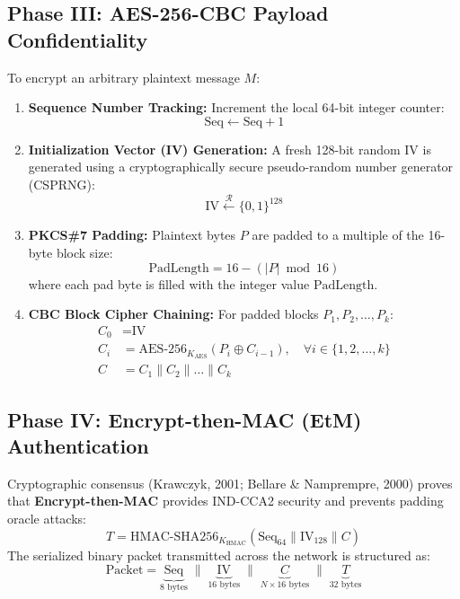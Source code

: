 \documentclass[11pt,a4paper]{article}
\begin{document}
\subsection{Phase III: AES-256-CBC Payload Confidentiality}
To encrypt an arbitrary plaintext message $M$:
\begin{enumerate}[leftmargin=1cm]
    \item \textbf{Sequence Number Tracking:} Increment the local 64-bit integer counter:
    \begin{equation}
        \text{Seq} \leftarrow \text{Seq} + 1
    \end{equation}
    \item \textbf{Initialization Vector (IV) Generation:} A fresh 128-bit random IV is generated using a cryptographically secure pseudo-random number generator (CSPRNG):
    \begin{equation}
        \text{IV} \xleftarrow{\mathcal{R}} \{0, 1\}^{128}
    \end{equation}
    \item \textbf{PKCS\#7 Padding:} Plaintext bytes $P$ are padded to a multiple of the 16-byte block size:
    \begin{equation}
        \text{PadLength} = 16 - (|P| \bmod 16)
    \end{equation}
    where each pad byte is filled with the integer value $\text{PadLength}$.
    \item \textbf{CBC Block Cipher Chaining:} For padded blocks $P_1, P_2, \dots, P_k$:
    \begin{align}
        C_0 &= \text{IV} \\
        C_i &= \text{AES-256}_{K_{\text{AES}}}(P_i \oplus C_{i-1}), \quad \forall i \in \{1, 2, \dots, k\} \\
        C &= C_1 \parallel C_2 \parallel \dots \parallel C_k
    \end{align}
\end{enumerate}

\subsection{Phase IV: Encrypt-then-MAC (EtM) Authentication}
Cryptographic consensus (Krawczyk, 2001; Bellare \& Namprempre, 2000) proves that \textbf{Encrypt-then-MAC} provides IND-CCA2 security and prevents padding oracle attacks:
\begin{equation}
    T = \text{HMAC-SHA256}_{K_{\text{HMAC}}}\left(\text{Seq}_{64} \parallel \text{IV}_{128} \parallel C\right)
\end{equation}
The serialized binary packet transmitted across the network is structured as:
\begin{equation}
    \text{Packet} = \underbrace{\text{Seq}}_{8\text{ bytes}} \;\parallel\; \underbrace{\text{IV}}_{16\text{ bytes}} \;\parallel\; \underbrace{C}_{N \times 16\text{ bytes}} \;\parallel\; \underbrace{T}_{32\text{ bytes}}
\end{equation}
\end{document}
